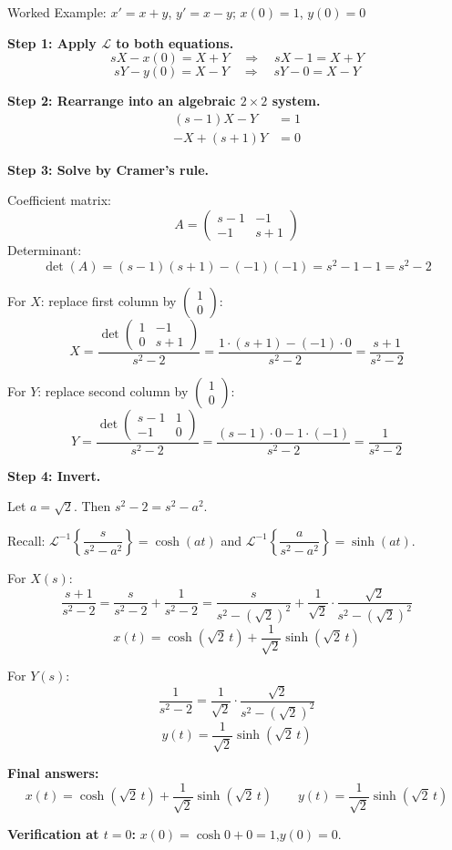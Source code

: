 \documentclass[12pt,a4paper]{article}
\begin{document}
\begin{infobox}{Worked Example: $x'=x+y$, $y'=x-y$; $x(0)=1$, $y(0)=0$}

\textbf{Step 1: Apply $\mathcal{L}$ to both equations.}
\[
sX - x(0) = X + Y \quad\Rightarrow\quad sX - 1 = X + Y
\]
\[
sY - y(0) = X - Y \quad\Rightarrow\quad sY - 0 = X - Y
\]

\textbf{Step 2: Rearrange into an algebraic $2\times 2$ system.}
\begin{align}
(s-1)X - Y &= 1 \tag{i} \\
-X + (s+1)Y &= 0 \tag{ii}
\end{align}

\textbf{Step 3: Solve by Cramer's rule.}

Coefficient matrix:
\[
A = \begin{pmatrix} s-1 & -1 \\ -1 & s+1 \end{pmatrix}
\]
Determinant:
\[
\det(A) = (s-1)(s+1) - (-1)(-1) = s^2 - 1 - 1 = s^2 - 2
\]

For $X$: replace first column by $\begin{pmatrix}1\\0\end{pmatrix}$:
\[
X = \frac{\det\!\begin{pmatrix}1 & -1\\0 & s+1\end{pmatrix}}{s^2-2}
= \frac{1\cdot(s+1)-(-1)\cdot 0}{s^2-2}
= \frac{s+1}{s^2-2}
\]

For $Y$: replace second column by $\begin{pmatrix}1\\0\end{pmatrix}$:
\[
Y = \frac{\det\!\begin{pmatrix}s-1 & 1\\-1 & 0\end{pmatrix}}{s^2-2}
= \frac{(s-1)\cdot 0 - 1\cdot(-1)}{s^2-2}
= \frac{1}{s^2-2}
\]

\textbf{Step 4: Invert.}

Let $a = \sqrt{2}$. Then $s^2 - 2 = s^2 - a^2$.

Recall: $\mathcal{L}^{-1}\!\left\{\dfrac{s}{s^2-a^2}\right\} = \cosh(at)$ and
$\mathcal{L}^{-1}\!\left\{\dfrac{a}{s^2-a^2}\right\} = \sinh(at)$.

For $X(s)$:
\[
\frac{s+1}{s^2-2} = \frac{s}{s^2-2} + \frac{1}{s^2-2}
= \frac{s}{s^2-(\sqrt{2})^2} + \frac{1}{\sqrt{2}}\cdot\frac{\sqrt{2}}{s^2-(\sqrt{2})^2}
\]
\[
x(t) = \cosh(\sqrt{2}\,t) + \frac{1}{\sqrt{2}}\sinh(\sqrt{2}\,t)
\]

For $Y(s)$:
\[
\frac{1}{s^2-2} = \frac{1}{\sqrt{2}}\cdot\frac{\sqrt{2}}{s^2-(\sqrt{2})^2}
\]
\[
y(t) = \frac{1}{\sqrt{2}}\sinh(\sqrt{2}\,t)
\]

\textbf{Final answers:}
\[
\boxed{x(t) = \cosh(\sqrt{2}\,t) + \frac{1}{\sqrt{2}}\sinh(\sqrt{2}\,t)}
\qquad
\boxed{y(t) = \frac{1}{\sqrt{2}}\sinh(\sqrt{2}\,t)}
\]

\textbf{Verification at $t=0$:} $x(0)=\cosh 0 + 0 = 1$\;\checkmark,\quad $y(0)=0$\;\checkmark.
\end{infobox}
\end{document}
